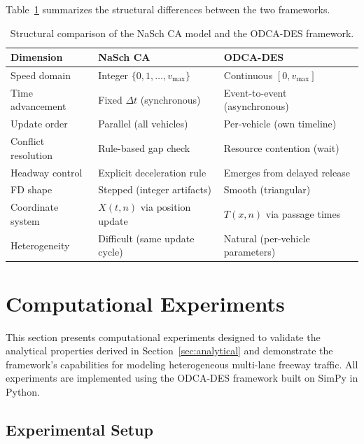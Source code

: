 \documentclass[review,authoryear]{elsarticle}
\begin{document}
Table~\ref{tab:comparison_summary} summarizes the structural differences between the two frameworks.

\begin{table}[ht]
\centering
\caption{Structural comparison of the NaSch CA model and the ODCA-DES framework.}
\label{tab:comparison_summary}
\begin{tabular}{@{}lll@{}}
\toprule
Dimension & NaSch CA & ODCA-DES \\
\midrule
Speed domain & Integer $\{0,1,\ldots,v_{\max}\}$ & Continuous $[0, v_{\max}]$ \\
Time advancement & Fixed $\Delta t$ (synchronous) & Event-to-event (asynchronous) \\
Update order & Parallel (all vehicles) & Per-vehicle (own timeline) \\
Conflict resolution & Rule-based gap check & Resource contention (wait) \\
Headway control & Explicit deceleration rule & Emerges from delayed release \\
FD shape & Stepped (integer artifacts) & Smooth (triangular) \\
Coordinate system & $X(t,n)$ via position update & $T(x,n)$ via passage times \\
Heterogeneity & Difficult (same update cycle) & Natural (per-vehicle parameters) \\
\bottomrule
\end{tabular}
\end{table}


\section{Computational Experiments}
\label{sec:experiments}

This section presents computational experiments designed to validate the analytical properties derived in Section~\ref{sec:analytical} and demonstrate the framework's capabilities for modeling heterogeneous multi-lane freeway traffic. All experiments are implemented using the ODCA-DES framework built on SimPy \citep{simpy2023} in Python.

\subsection{Experimental Setup}
\label{sec:exp_setup}
\end{document}
